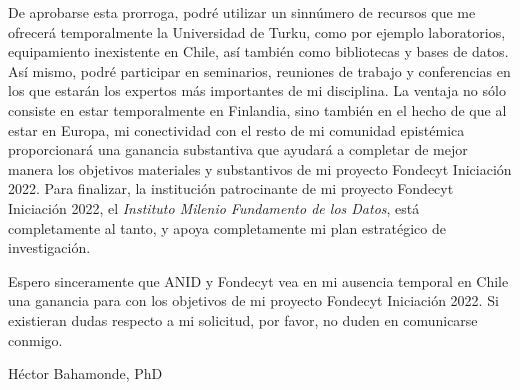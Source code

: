 \documentclass[9pt,stdletter,dateno,sigleft,openany]{newlfm} %
\begin{document}
\begin{newlfm}
De aprobarse esta prorroga, podr\'e utilizar un sinn\'umero de recursos que me ofrecer\'a temporalmente la Universidad de Turku, como por ejemplo laboratorios, equipamiento inexistente en Chile, as\'i tambi\'en como bibliotecas y bases de datos. As\'i mismo, podr\'e participar en seminarios, reuniones de trabajo y conferencias en los que estar\'an los expertos m\'as importantes de mi disciplina. La ventaja no s\'olo consiste en estar temporalmente en Finlandia, sino tambi\'en en el hecho de que al estar en Europa, mi conectividad con el resto de mi comunidad epist\'emica proporcionar\'a una ganancia substantiva que ayudar\'a a completar de mejor manera los objetivos materiales y substantivos de mi proyecto Fondecyt Iniciaci\'on 2022. Para finalizar, la instituci\'on patrocinante de mi proyecto Fondecyt Iniciaci\'on 2022, el \emph{Instituto Milenio Fundamento de los Datos}, est\'a completamente al tanto, y apoya completamente mi plan estrat\'egico de investigaci\'on.

Espero sinceramente que ANID y Fondecyt vea en mi ausencia temporal en Chile una ganancia para con los objetivos de mi proyecto Fondecyt Iniciaci\'on 2022. Si existieran dudas respecto a mi solicitud, por favor, no duden en comunicarse conmigo.

{\vspace{0.5cm}\hspace{10cm}H\'ector Bahamonde, PhD}


\end{newlfm}
\end{document}

